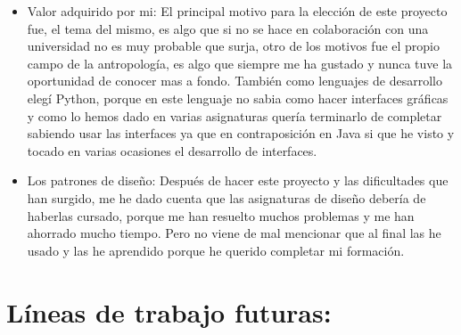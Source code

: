 \begin{itemize}
\item Valor adquirido por mi: 
El principal motivo para la elección de este proyecto fue, el tema del mismo, es algo que si no se hace en colaboración con una universidad no es muy probable que surja, otro de los motivos fue el propio campo de la antropología, es algo que siempre me ha gustado y nunca tuve la oportunidad de conocer mas a fondo.
También como lenguajes de desarrollo elegí Python, porque en este lenguaje no sabia como hacer interfaces gráficas y como lo hemos dado en varias asignaturas quería terminarlo de completar sabiendo usar las interfaces ya que en contraposición en Java si que he visto y tocado en varias ocasiones el desarrollo de interfaces.

\item Los patrones de diseño:
Después de hacer este proyecto y las dificultades que han surgido, me he dado cuenta que las asignaturas de diseño debería de haberlas cursado, porque me han resuelto muchos problemas y me han ahorrado mucho tiempo.
Pero no viene de mal mencionar que al final las he usado y las he aprendido porque he querido completar mi formación.


\end{itemize}



\section{Líneas de trabajo futuras:}
